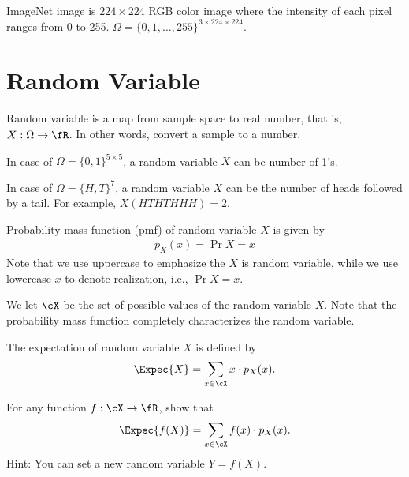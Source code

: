 \documentclass{article}
\begin{document}
\begin{example}[ImageNet]
    ImageNet image is $224\times 224$ RGB color image where the intensity of each pixel ranges from 0 to 255.
    $\Omega = \{0, 1, \dots, 255\}^{3 \times 224\times 224}$.
\end{example}

\section{Random Variable}
Random variable is a map from sample space to real number, that is, $X:\Omega\rightarrow \fR$.
In other words, convert a sample to a number.

\begin{example}
    In case of $\Omega = \{0, 1\} ^{5\times 5}$, a random variable $X$ can be number of 1's.    
\end{example}

\begin{example}
    In case of $\Omega = \{H, T\} ^{7}$, a random variable $X$ can be the number of heads followed by a tail.
    For example, $X(HTHTHHH)=2$.
\end{example}

Probability mass function (pmf) of random variable $X$ is given by
\begin{align}
    p_X(x) = \Pr{X=x}
\end{align}
Note that we use uppercase to emphasize the $X$ is random variable,
while we use lowercase $x$ to denote realization, i.e., $\Pr{X=x}$.

We let $\cX$ be the set of possible values of the random variable $X$.
Note that the probability mass function completely characterizes the random variable.

\begin{definition}
    The expectation of random variable $X$ is defined by
    \begin{align}
        \Expec{X} = \sum_{x\in\cX} x \cdot p_X(x).
    \end{align}
\end{definition}
\begin{exercise}
    For any function $f:\cX\rightarrow \fR$, show that
    \begin{align}
        \Expec{f(X)} = \sum_{x\in\cX} f(x)\cdot p_X(x).
    \end{align}
    Hint: You can set a new random variable $Y= f(X)$.
\end{exercise}
\end{document}
